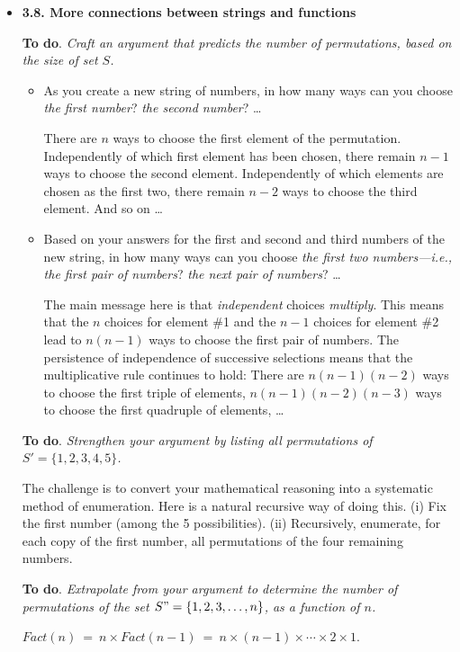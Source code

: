 


\begin{itemize}
\item
{\bf 3.8. More connections between strings and functions}
\medskip

{\bf To do}.  {\em Craft an argument that predicts the number of permutations, based on the size of set $S$.}
\smallskip

  \begin{itemize}
  \item
As you create a new string of numbers, in how many ways can you choose {\em the first number}? {\em the second number}? \ldots

\smallskip

There are $n$ ways to choose the first element of the permutation.  Independently of which first element has been chosen, there remain $n-1$ ways to choose the second element. Independently of which elements are chosen as the first two, there remain $n-2$ ways to choose the third element.  And so on \ldots

  \medskip\item
Based on your answers for the first and second and third numbers of the new string, in how many ways can you choose {\em the first two numbers---i.e., the first {\em pair} of numbers}?  {\em the next pair of numbers}? \ldots

\smallskip

The main message here is that {\em independent} choices {\em multiply}.  This means that the $n$ choices for element \#1 and the $n-1$ choices for element \#2 lead to $n(n-1)$ ways to choose the first pair of numbers.  The persistence of independence of successive selections means that the multiplicative rule continues to hold: There are $n(n-1)(n-2)$ ways to choose the first triple of elements, $n(n-1)(n-2)(n-3)$ ways to choose the first quadruple of elements, \ldots
  \end{itemize}

{\bf To do}. {\em Strengthen your argument by listing all permutations of  $S' =  \{1,2,3,4,5\}$.}

\smallskip

The challenge is to convert your mathematical reasoning into a systematic method of
enumeration.  Here is a natural recursive way of doing this. (i) Fix the first number (among the 5 possibilities).  (ii) Recursively, enumerate, for each copy of the first number, all permutations of the four remaining numbers.

\smallskip

{\bf To do}. {\em Extrapolate from your argument to determine the number of permutations of the set $S" =  \{1,2,3, \ldots, n\}$, as a function of $n$.}

\smallskip

$Fact(n) \ = \ n \times Fact(n-1) \ = \ n \times (n-1) \times \cdots \times 2 \times 1$.

\end{itemize}


